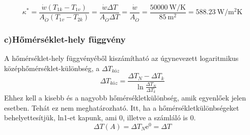 \begin{equation}
\kappa^*=\dfrac{\dot{w} \left(T_{1k} - T_{1v}\right)}{A_{\ddot{O}} \left(T_{1v} - T_{2k}\right)} =\dfrac{\dot{w} \Delta T}{A_{\ddot{O}} \Delta T}=\dfrac{\dot{w}}{A_\ddot{O}}=\dfrac{\SI{50000}{\watt\per\kelvin}}{\SI{85}{\meter\squared}}=\SI{588.23}{\watt\per\meter\squared\kelvin}
\end{equation}

\vspace{5mm}
\subsubsection*{c)Hőmérséklet-hely függvény}
  A hőmérséklet-hely függvényéből kiszámítható az úgynevezett  logaritmikus középhőmérséklet-különbség, a $\Delta T_{\textit{köz}}$   
\begin{equation}
\Delta T_{\textit{köz}}=\dfrac{\Delta T_N - \Delta T_k}{\ln\frac{\Delta T_N}{\Delta T_k}}
\end{equation}
Ehhez kell a kisebb és a nagyobb hőmérsékletkülönbség, amik egyenlőek jelen esetben. Tehát ez nem meghatározható. Itt, ha a hőmérsékletkülönbségeket behelyettesítjük, ln1-et kapunk, ami 0, illetve a számláló is 0.
\begin{equation}
\Delta T(A) = \Delta T_{N}\mathrm{e}^{0} = \Delta T
\end{equation}
